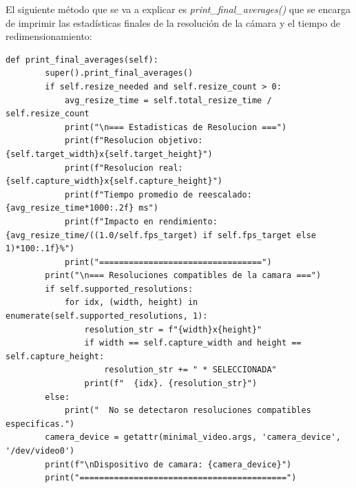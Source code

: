 El siguiente método que se va a explicar es \textit{print\_final\_averages()} que se encarga de imprimir las estadísticas finales de la resolución de la cámara y el tiempo de redimensionamiento:
\begin{lstlisting}[style=pythonstyle, caption={Método print\_final\_averages() de \textit{Minimal\_Video\_Resolution\_verbose}}, label={lst:print_final_averages}]
def print_final_averages(self):
        super().print_final_averages()
        if self.resize_needed and self.resize_count > 0:
            avg_resize_time = self.total_resize_time / self.resize_count
            print("\n=== Estadisticas de Resolucion ===")
            print(f"Resolucion objetivo: {self.target_width}x{self.target_height}")
            print(f"Resolucion real: {self.capture_width}x{self.capture_height}")
            print(f"Tiempo promedio de reescalado: {avg_resize_time*1000:.2f} ms")
            print(f"Impacto en rendimiento:        {avg_resize_time/((1.0/self.fps_target) if self.fps_target else 1)*100:.1f}%")
            print("=================================")
        print("\n=== Resoluciones compatibles de la camara ===")
        if self.supported_resolutions:
            for idx, (width, height) in enumerate(self.supported_resolutions, 1):
                resolution_str = f"{width}x{height}"
                if width == self.capture_width and height == self.capture_height:
                    resolution_str += " * SELECCIONADA"
                print(f"  {idx}. {resolution_str}")
        else:
            print("  No se detectaron resoluciones compatibles especificas.")
        camera_device = getattr(minimal_video.args, 'camera_device', '/dev/video0')
        print(f"\nDispositivo de camara: {camera_device}")
        print("==========================================")
\end{lstlisting}
\vspace{\baselineskip}

